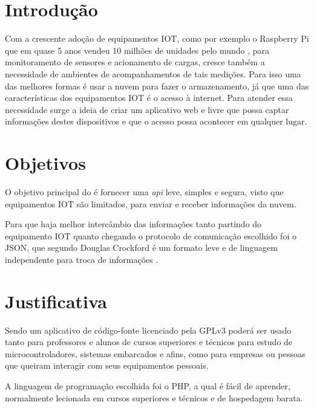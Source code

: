 \section{Introdução}\label{introduuxe7uxe3o}

Com a crescente adoção de equipamentos IOT, como por exemplo o Raspberry
Pi que em quase 5 anos vendeu 10 milhões de unidades pelo mundo
\cite{raspberry-pi-blog:2016}, para monitoramento de sensores e
acionamento de cargas, cresce também a necessidade de ambientes de
acompanhamentos de tais medições. Para isso uma das melhores formas é
usar a nuvem para fazer o armazenamento, já que uma das características
dos equipamentos IOT é o acesso à internet. Para atender essa
necessidade surge a ideia de criar um aplicativo web e livre que possa
captar informações destes dispositivos e que o acesso possa acontecer em
qualquer lugar.

\section{Objetivos}\label{objetivos}

O objetivo principal do \wm é fornecer uma \emph{api} leve, simples e
segura, visto que equipamentos IOT são limitados, para enviar e receber
informações da nuvem.

Para que haja melhor intercâmbio das informações tanto partindo do
equipamento IOT quanto chegando o protocolo de comunicação escolhido foi
o JSON, que segundo Douglas Crockford é um formato leve e de linguagem
independente para troca de informações \cite{crockford-2015}.

\section{Justificativa}\label{justificativa}

Sendo um aplicativo de código-fonte licenciado pela GPLv3 poderá ser
usado tanto para professores e alunos de cursos superiores e técnicos
para estudo de microcontroladores, sistemas embarcados e afins, como
para empresas ou pessoas que queiram interagir com seus equipamentos
pessoais.

A linguagem de programação escolhida foi o PHP, a qual é fácil de
aprender, normalmente lecionada em cursos superiores e técnicos e de
hospedagem barata.

